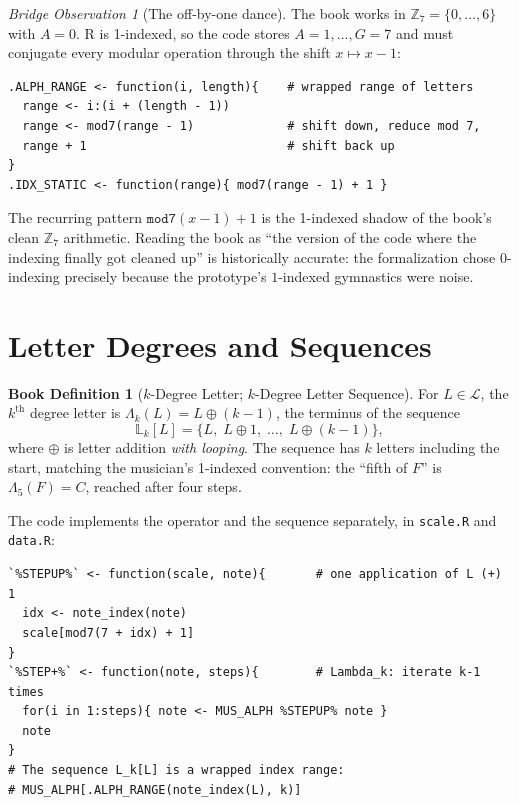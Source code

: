 \documentclass[11pt]{article}
\newcommand{\MAlph}{\mathcal{L}}                 %
\newcommand{\Lam}{\Lambda}                      %
\newcommand{\LSeq}{\mathbb{L}}                  %
\newcommand{\Zseven}{\mathbb{Z}_7}
\theoremstyle{definition}
\newtheorem{bookdef}{Book Definition}[section]
\theoremstyle{remark}
\newtheorem{bridge}{Bridge Observation}[section]
\newcommand{\code}[1]{\texttt{#1}}
\newcommand{\file}[1]{\texttt{#1}}
\begin{document}
\begin{bridge}[The off-by-one dance]\label{obs:offbyone}
The book works in $\Zseven = \{0,\dots,6\}$ with $A = 0$. R is 1-indexed, so the
code stores $A = 1, \dots, G = 7$ and must conjugate every modular operation
through the shift $x \mapsto x - 1$:
\begin{lstlisting}
.ALPH_RANGE <- function(i, length){    # wrapped range of letters
  range <- i:(i + (length - 1))
  range <- mod7(range - 1)             # shift down, reduce mod 7,
  range + 1                            # shift back up
}
.IDX_STATIC <- function(range){ mod7(range - 1) + 1 }
\end{lstlisting}
The recurring pattern $\code{mod7}(x-1)+1$ is the 1-indexed shadow of the book's
clean $\Zseven$ arithmetic. Reading the book as ``the version of the code where
the indexing finally got cleaned up'' is historically accurate: the formalization
chose $0$-indexing precisely because the prototype's $1$-indexed gymnastics were
noise.
\end{bridge}

\section{Letter Degrees and Sequences}\label{sec:degrees}

\begin{bookdef}[$k$-Degree Letter; $k$-Degree Letter Sequence]
For $L \in \MAlph$, the $k^{\text{th}}$ degree letter is
$\Lam_k(L) = L \oplus (k-1)$, the terminus of the sequence
$$\LSeq_k[L] = \{L,\; L \oplus 1,\; \dots,\; L \oplus (k-1)\},$$
where $\oplus$ is letter addition \emph{with looping}. The sequence has $k$
letters including the start, matching the musician's 1-indexed convention:
the ``fifth of $F$'' is $\Lam_5(F) = C$, reached after four steps.
\end{bookdef}

The code implements the operator and the sequence separately, in
\file{scale.R} and \file{data.R}:

\begin{lstlisting}
`%STEPUP%` <- function(scale, note){       # one application of L (+) 1
  idx <- note_index(note)
  scale[mod7(7 + idx) + 1]
}
`%STEP+%` <- function(note, steps){        # Lambda_k: iterate k-1 times
  for(i in 1:steps){ note <- MUS_ALPH %STEPUP% note }
  note
}
# The sequence L_k[L] is a wrapped index range:
# MUS_ALPH[.ALPH_RANGE(note_index(L), k)]
\end{lstlisting}
\end{document}
